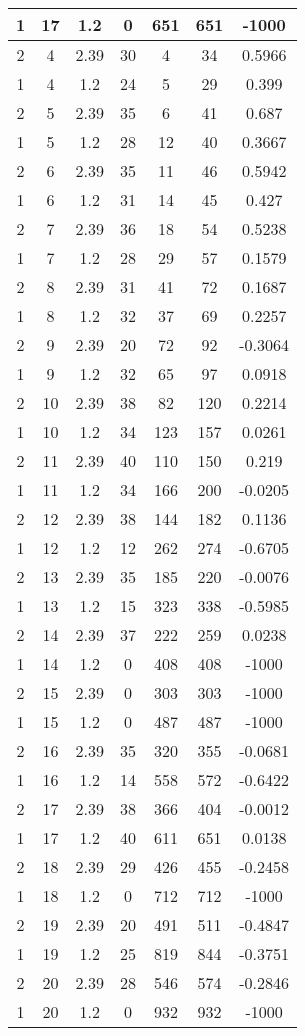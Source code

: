\documentclass[letterpaper, 12pt]{article}
\begin{document}
\begin{longtable}{|c|c|c|c|c|c|c|}
\hline
1 & 17 & 1.2 & 0 & 651 & 651 & -1000 \\
\hline
2 & 4 & 2.39 & 30 & 4 & 34 & 0.5966 \\
\hline
1 & 4 & 1.2 & 24 & 5 & 29 & 0.399 \\
\hline
2 & 5 & 2.39 & 35 & 6 & 41 & 0.687 \\
\hline
1 & 5 & 1.2 & 28 & 12 & 40 & 0.3667 \\
\hline
2 & 6 & 2.39 & 35 & 11 & 46 & 0.5942 \\
\hline
1 & 6 & 1.2 & 31 & 14 & 45 & 0.427 \\
\hline
2 & 7 & 2.39 & 36 & 18 & 54 & 0.5238 \\
\hline
1 & 7 & 1.2 & 28 & 29 & 57 & 0.1579 \\
\hline
2 & 8 & 2.39 & 31 & 41 & 72 & 0.1687 \\
\hline
1 & 8 & 1.2 & 32 & 37 & 69 & 0.2257 \\
\hline
2 & 9 & 2.39 & 20 & 72 & 92 & -0.3064 \\
\hline
1 & 9 & 1.2 & 32 & 65 & 97 & 0.0918 \\
\hline
2 & 10 & 2.39 & 38 & 82 & 120 & 0.2214 \\
\hline
1 & 10 & 1.2 & 34 & 123 & 157 & 0.0261 \\
\hline
2 & 11 & 2.39 & 40 & 110 & 150 & 0.219 \\
\hline
1 & 11 & 1.2 & 34 & 166 & 200 & -0.0205 \\
\hline
2 & 12 & 2.39 & 38 & 144 & 182 & 0.1136 \\
\hline
1 & 12 & 1.2 & 12 & 262 & 274 & -0.6705 \\
\hline
2 & 13 & 2.39 & 35 & 185 & 220 & -0.0076 \\
\hline
1 & 13 & 1.2 & 15 & 323 & 338 & -0.5985 \\
\hline
2 & 14 & 2.39 & 37 & 222 & 259 & 0.0238 \\
\hline
1 & 14 & 1.2 & 0 & 408 & 408 & -1000 \\
\hline
2 & 15 & 2.39 & 0 & 303 & 303 & -1000 \\
\hline
1 & 15 & 1.2 & 0 & 487 & 487 & -1000 \\
\hline
2 & 16 & 2.39 & 35 & 320 & 355 & -0.0681 \\
\hline
1 & 16 & 1.2 & 14 & 558 & 572 & -0.6422 \\
\hline
2 & 17 & 2.39 & 38 & 366 & 404 & -0.0012 \\
\hline
1 & 17 & 1.2 & 40 & 611 & 651 & 0.0138 \\
\hline
2 & 18 & 2.39 & 29 & 426 & 455 & -0.2458 \\
\hline
1 & 18 & 1.2 & 0 & 712 & 712 & -1000 \\
\hline
2 & 19 & 2.39 & 20 & 491 & 511 & -0.4847 \\
\hline
1 & 19 & 1.2 & 25 & 819 & 844 & -0.3751 \\
\hline
2 & 20 & 2.39 & 28 & 546 & 574 & -0.2846 \\
\hline
1 & 20 & 1.2 & 0 & 932 & 932 & -1000 \\
\hline
\end{longtable}
\end{document}
